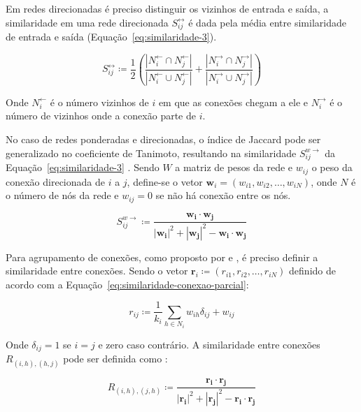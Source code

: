 \documentclass[12pt,a4paper]{article}
\theoremstyle{hypo}
\renewcommand\vec{\mathbf} %
\newcommand{\defn}{\coloneqq} %
\newcommand{\linkin}[1]{#1^\leftarrow} %
\newcommand{\linkout}[1]{#1^\rightarrow} %
\newcommand{\linkboth}[1]{#1^\leftrightarrow} %
\newcommand{\weighteddir}[1]{#1^{w\rightarrow}} %
\begin{document}
Em redes direcionadas é preciso distinguir os vizinhos de entrada e saída, a similaridade em uma rede direcionada $\linkboth{S}_{ij}$ é dada pela média entre similaridade de entrada e saída (Equação~\ref{eq:similaridade-3}).

\begin{equation} \label{eq:similaridade-3}
    \linkboth{S}_{ij} \defn \frac{1}{2} \left( \frac{|\linkin{N}_i \cap \linkin{N}_j|}{|\linkin{N}_i \cup \linkin{N}_j|} + \frac{|\linkout{N}_i \cap \linkout{N}_j|}{|\linkout{N}_i \cup \linkout{N}_j|} \right)
\end{equation}

Onde $\linkin{N}_i$ é o número vizinhos de $i$ em que as conexões chegam a ele e $\linkout{N}_i$ é o número de vizinhos onde a conexão parte de $i$.

No caso de redes ponderadas e direcionadas, o índice de Jaccard pode ser generalizado no coeficiente de Tanimoto, resultando na similaridade $\weighteddir{S}_{ij}$ da Equação~\ref{eq:similaridade-3} \cite{Ahn2010-uh}. Sendo $W$ a matriz de pesos da rede e $w_{ij}$ o peso da conexão direcionada de $i$ a $j$, define-se o vetor $\vec{w}_i = (w_{i1},w_{i2},\ldots,w_{iN})$, onde $N$ é o número de nós da rede e $w_{ij} = 0$ se não há conexão entre os nós.

\begin{equation}
\weighteddir{S}_{ij} \defn \frac{\vec{w_i} \cdot \vec{w_j}}{|\vec{w_i}|^2 + |\vec{w_j}|^2 - \vec{w_i} \cdot \vec{w_j}}
\end{equation}

Para agrupamento de conexões, como proposto por  e , é preciso definir a similaridade entre conexões. Sendo o vetor $\vec{r}_{i} \defn (r_{i1}, r_{i2}, \ldots, r_{iN})$ definido de acordo com a Equação~\ref{eq:similaridade-conexao-parcial}:

\begin{equation} \label{eq:similaridade-conexao-parcial}
r_{ij} \defn \frac{1}{k_i} \sum_{h \in N_i} w_{ih}\delta_{ij} + w_{ij}
\end{equation}

Onde $\delta_{ij} = 1$ se $i = j$ e zero caso contrário. A similaridade entre conexões $R_{(i,h),(h,j)}$ pode ser definida como \cite{Ahn2010-uh}:

\begin{equation}
R_{(i,h),(j,h)} \defn \frac{\vec{r_i} \cdot \vec{r_j}}{|\vec{r_i}|^2 + |\vec{r_j}|^2 -  \vec{r_i} \cdot \vec{r_j}}
\end{equation}
\end{document}
